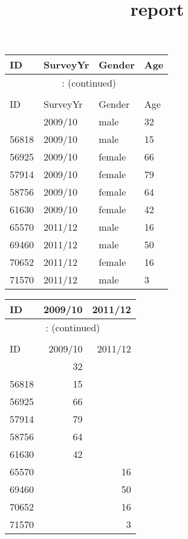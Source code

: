 \documentclass[8pt]{beamer}
\begin{document}
\title[{\makebox[.95\paperwidth]{\hfill\insertframenumber/\inserttotalframenumber}}]{ report \\}
\begin{frame}\titlepage
\end{frame}
\begin{frame}
\hypertarget{listing}{} 
\begingroup\footnotesize\begin{longtable}{llll}
\toprule
ID & SurveyYr & Gender & Age\\
\hline
\endfirsthead
\multicolumn{4}{c}{\tablename~\thetable{}: (continued)}\\\\
\toprule
ID & SurveyYr & Gender & Age\\
\hline
\endhead \hline \endfoot \hline
\endlastfoot
55460 & 2009/10 & male & 32 \\
56818 & 2009/10 & male & 15 \\
56925 & 2009/10 & female & 66 \\
57914 & 2009/10 & female & 79 \\
58756 & 2009/10 & female & 64 \\
61630 & 2009/10 & female & 42 \\
65570 & 2011/12 & male & 16 \\
69460 & 2011/12 & male & 50 \\
70652 & 2011/12 & female & 16 \\
71570 & 2011/12 & male &  3 \\
\end{longtable}

\endgroup
\end{frame}
\begin{frame}
\hypertarget{table}{} 
\begingroup\footnotesize\begin{longtable}{lrr}
\toprule
ID & 2009/10 & 2011/12 \\
\hline
\endfirsthead
\multicolumn{3}{c}{\tablename~\thetable{}: (continued)}\\\\
\toprule
ID & 2009/10 & 2011/12 \\
\hline
\endhead \hline \endfoot \hline
\endlastfoot
55460 & 32 &  \\
56818 & 15 &  \\
56925 & 66 &  \\
57914 & 79 &  \\
58756 & 64 &  \\
61630 & 42 &  \\
65570 &  & 16 \\
69460 &  & 50 \\
70652 &  & 16 \\
71570 &  & 3 \\
\end{longtable}

\endgroup
\end{frame}
\end{document}
